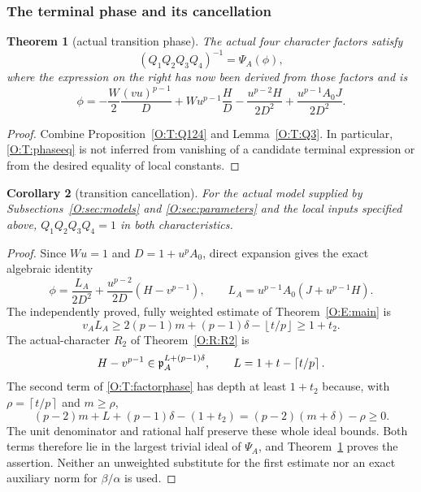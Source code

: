 \documentclass[11pt]{amsart}
\newtheorem{theorem}{Theorem}[section]
\newtheorem{corollary}[theorem]{Corollary}
\theoremstyle{definition}
\theoremstyle{remark}
\newcommand{\ceil}[1]{\left\lceil #1\right\rceil}
\newcommand{\floor}[1]{\left\lfloor #1\right\rfloor}
\begin{document}
\subsubsection*{The terminal phase and its cancellation}
\begin{theorem}[actual transition phase]\label{O:T:phase}
The actual four character factors satisfy
\begin{equation}\label{O:T:phaseeq}
 (Q_1Q_2Q_3Q_4)^{-1}=\Psi_A(\phi),
\end{equation}
where the expression on the right has now been derived from those
factors and is
\begin{equation}\label{O:T:phidef}
 \phi=-\frac W2\frac{(vu)^{p-1}}D
       +Wu^{p-1}\frac HD
       -\frac{u^{p-2}H}{2D^2}
       +\frac{u^{p-1}A_0J}{2D^2}.
\end{equation}
\end{theorem}
\begin{proof}
Combine Proposition~\ref{O:T:Q124} and Lemma~\ref{O:T:Q3}. In particular,
\eqref{O:T:phaseeq} is not inferred from vanishing of a candidate terminal
expression or from the desired equality of local constants.
\end{proof}

\begin{corollary}[transition cancellation]\label{O:T:cancel}
For the actual model supplied by Subsections~\ref{O:sec:models} and \ref{O:sec:parameters} and the local inputs
specified above, $Q_1Q_2Q_3Q_4=1$ in both characteristics.
\end{corollary}
\begin{proof}
Since $Wu=1$ and $D=1+u^pA_0$, direct expansion gives the exact
algebraic identity
\begin{equation}\label{O:T:factorphase}
 \phi=\frac{L_A}{2D^2}
       +\frac{u^{p-2}}{2D}(H-v^{p-1}),\qquad
 L_A=u^{p-1}A_0(J+u^{p-1}H).
\end{equation}
The independently proved, fully weighted estimate of Theorem~\ref{O:E:main} is
\[
 v_A L_A\ge2(p-1)m+(p-1)\delta-\floor{t/p}\ge1+t_2.
\]
The actual-character $R_2$ of Theorem~\ref{O:R:R2} is
\[
 H-v^{p-1}\in\pp_A^{L+(p-1)\delta},\qquad
 L=1+t-\ceil{t/p}.
\]
The second term of \eqref{O:T:factorphase} has depth at least $1+t_2$
because, with $\rho=\ceil{t/p}$ and $m\ge\rho$,
\[
 (p-2)m+L+(p-1)\delta-(1+t_2)
 =(p-2)(m+\delta)-\rho\ge0.
\]
The unit denominator and rational half preserve these whole ideal
bounds. Both terms therefore lie in the largest trivial ideal of
$\Psi_A$, and Theorem~\ref{O:T:phase} proves the assertion.
Neither an unweighted substitute for the first estimate nor an exact
auxiliary norm for $\beta/\alpha$ is used.
\end{proof}
\end{document}
